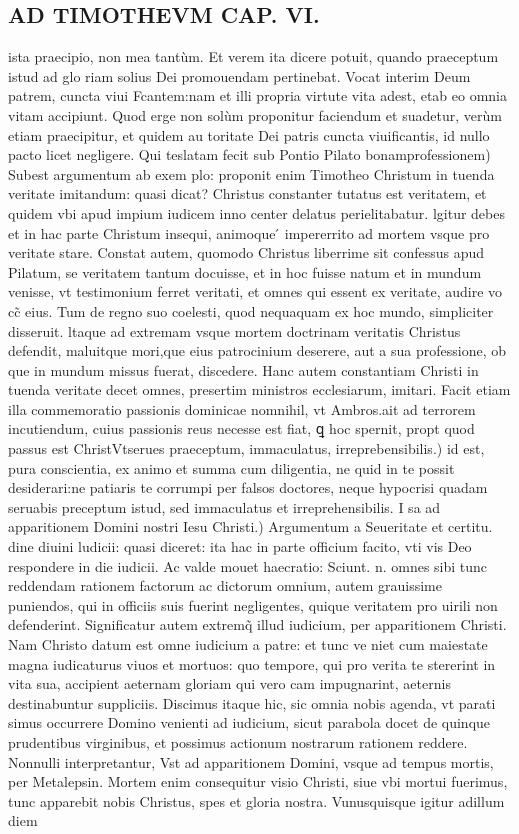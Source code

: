 \documentclass{article}
\begin{document}
\begin{pages}
\section*{AD TIMOTHEVM CAP. VI. }
\marginpar{[ p.129 ]}\pstart ista praecipio, non mea tantùm. Et verem ita dicere potuit, quando praeceptum istud ad glo riam solius Dei promouendam pertinebat. Vocat interim Deum patrem, cuncta viui Fcantem:nam et illi propria virtute vita adest, etab eo omnia vitam accipiunt. Quod erge non solùm proponitur faciendum et suadetur, verùm etiam praecipitur, et quidem au toritate Dei patris cuncta viuificantis, id nullo pacto licet negligere.  \pend\pstart Qui teslatam fecit sub Pontio Pilato bonamprofessionem) Subest argumentum ab exem plo: proponit enim Timotheo Christum in tuenda veritate imitandum: quasi dicat? Christus constanter tutatus est veritatem, et quidem vbi apud impium iudicem inno center delatus perielitabatur. lgitur debes et in hac parte Christum insequi, animoque ́ impererrito ad mortem vsque pro veritate stare. Constat autem, quomodo Christus liberrime sit confessus apud Pilatum, se veritatem tantum docuisse, et in hoc fuisse natum et in mundum venisse, vt testimonium ferret veritati, et omnes qui essent ex veritate, audire vo cc̃ eius. Tum de regno suo coelesti, quod nequaquam ex hoc mundo, simpliciter disseruit. ltaque ad extremam vsque mortem doctrinam veritatis Christus defendit, maluitque mori,que eius patrocinium deserere, aut a sua professione, ob que in mundum missus fuerat, discedere. Hanc autem constantiam Christi in tuenda veritate decet omnes, presertim ministros ecclesiarum, imitari. Facit etiam illa commemoratio passionis dominicae nomnihil, vt Ambros.ait ad terrorem incutiendum, cuius passionis reus necesse est fiat, ꝗ hoc spernit, propt quod passus est ChristVtserues praeceptum, immaculatus, irreprebensibilis.) id est, pura conscientia, ex animo et summa cum diligentia, ne quid in te possit desiderari:ne patiaris te corrumpi per falsos doctores, neque hypocrisi quadam seruabis preceptum istud, sed immaculatus et irreprehensibilis. I sa ad apparitionem Domini nostri Iesu Christi.) Argumentum a Seueritate et certitu. dine diuini ludicii: quasi diceret: ita hac in parte officium facito, vti vis Deo respondere in die iudicii. Ac valde mouet haecratio: Sciunt. n. omnes sibi tunc reddendam rationem factorum ac dictorum omnium, autem grauissime puniendos, qui in officiis suis fuerint negligentes, quique veritatem pro uirili non defenderint. Significatur autem extremq̃ illud iudicium, per apparitionem Christi. Nam Christo datum est omne iudicium a patre: et tunc ve niet cum maiestate magna iudicaturus viuos et mortuos: quo tempore, qui pro verita te stererint in vita sua, accipient aeternam gloriam qui vero cam impugnarint, aeternis destinabuntur suppliciis. Discimus itaque hic, sic omnia nobis agenda, vt parati simus occurrere Domino venienti ad iudicium, sicut parabola docet de quinque prudentibus virginibus, et possimus actionum nostrarum rationem reddere. Nonnulli interpretantur, Vst ad apparitionem Domini, vsque ad tempus mortis, per Metalepsin. Mortem enim consequitur visio Christi, siue vbi mortui fuerimus, tunc apparebit nobis Christus, spes et gloria nostra. Vunusquisque igitur adillum diem 
\end{pages}
\end{document}
